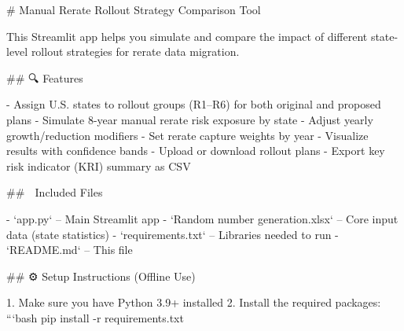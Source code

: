 # Manual Rerate Rollout Strategy Comparison Tool

This Streamlit app helps you simulate and compare the impact of different state-level rollout strategies for rerate data migration.

## 🔍 Features

- Assign U.S. states to rollout groups (R1–R6) for both original and proposed plans
- Simulate 8-year manual rerate risk exposure by state
- Adjust yearly growth/reduction modifiers
- Set rerate capture weights by year
- Visualize results with confidence bands
- Upload or download rollout plans
- Export key risk indicator (KRI) summary as CSV

## 📂 Included Files

- `app.py` – Main Streamlit app
- `Random number generation.xlsx` – Core input data (state statistics)
- `requirements.txt` – Libraries needed to run
- `README.md` – This file

## ⚙️ Setup Instructions (Offline Use)

1. Make sure you have Python 3.9+ installed
2. Install the required packages:
```bash
pip install -r requirements.txt